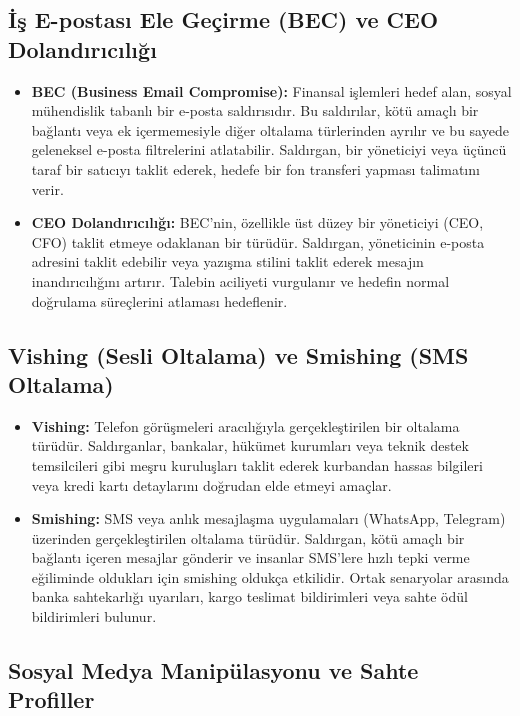 \subsection{İş E-postası Ele Geçirme (BEC) ve CEO Dolandırıcılığı}

\begin{itemize}
    \item \textbf{BEC (Business Email Compromise):} Finansal işlemleri hedef alan, sosyal mühendislik tabanlı bir e-posta saldırısıdır. Bu saldırılar, kötü amaçlı bir bağlantı veya ek içermemesiyle diğer oltalama türlerinden ayrılır ve bu sayede geleneksel e-posta filtrelerini atlatabilir. Saldırgan, bir yöneticiyi veya üçüncü taraf bir satıcıyı taklit ederek, hedefe bir fon transferi yapması talimatını verir.
    \item \textbf{CEO Dolandırıcılığı:} BEC'nin, özellikle üst düzey bir yöneticiyi (CEO, CFO) taklit etmeye odaklanan bir türüdür. Saldırgan, yöneticinin e-posta adresini taklit edebilir veya yazışma stilini taklit ederek mesajın inandırıcılığını artırır. Talebin aciliyeti vurgulanır ve hedefin normal doğrulama süreçlerini atlaması hedeflenir.
\end{itemize}

\subsection{Vishing (Sesli Oltalama) ve Smishing (SMS Oltalama)}

\begin{itemize}
    \item \textbf{Vishing:} Telefon görüşmeleri aracılığıyla gerçekleştirilen bir oltalama türüdür. Saldırganlar, bankalar, hükümet kurumları veya teknik destek temsilcileri gibi meşru kuruluşları taklit ederek kurbandan hassas bilgileri veya kredi kartı detaylarını doğrudan elde etmeyi amaçlar.
    \item \textbf{Smishing:} SMS veya anlık mesajlaşma uygulamaları (WhatsApp, Telegram) üzerinden gerçekleştirilen oltalama türüdür. Saldırgan, kötü amaçlı bir bağlantı içeren mesajlar gönderir ve insanlar SMS'lere hızlı tepki verme eğiliminde oldukları için smishing oldukça etkilidir. Ortak senaryolar arasında banka sahtekarlığı uyarıları, kargo teslimat bildirimleri veya sahte ödül bildirimleri bulunur.
\end{itemize}

\subsection{Sosyal Medya Manipülasyonu ve Sahte Profiller}


